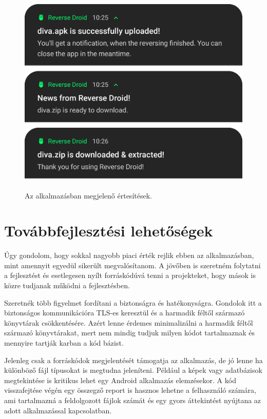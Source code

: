 \documentclass{thesis-ekf}
\theoremstyle{definition}
\theoremstyle{remark}
\begin{document}
\begin{figure}[!h]
	\centering
	\includegraphics[height=10cm]{pictures/notifications}
	\caption{Az alkalmazásban megjelenő értesítések.}
	\label{notifications}
\end{figure}

\chapter{Továbbfejlesztési lehetőségek}\label{lehetosegek}

Úgy gondolom, hogy sokkal nagyobb piaci érték rejlik ebben az alkalmazásban, mint amennyit egyedül sikerült megvalósítanom.
A jövőben is szeretném folytatni a fejlesztést és esetlegesen nyílt forráskódúvá tenni a projekteket, hogy mások is közre tudjanak működni a fejlesztésben.

Szeretnék több figyelmet fordítani a biztonságra és hatékonyságra. 
Gondolok itt a biztonságos kommunikációra TLS-es keresztül és a harmadik féltől származó könyvtárak csökkentésére.
Azért lenne érdemes minimalizálni a harmadik féltől származó könyvtárakat, mert nem mindig tudjuk milyen kódot tartalmaznak és mennyire tartják karban a kód bázist.

Jelenleg csak a forráskódok megjelentését támogatja az alkalmazás, de jó lenne ha különböző fájl típusokat is megtudna jeleníteni.
Például a képek vagy adatbázisok megtekintése is kritikus lehet egy Android alkalmazás elemzésekor.
A kód visszafejtése végén egy összegző report is hasznos lehetne a felhasználó számára, ami tartalmazná a feldolgozott fájlok számát és egy gyors áttekintést nyújtana az adott alkalmazással kapcsolatban.
\end{document}
